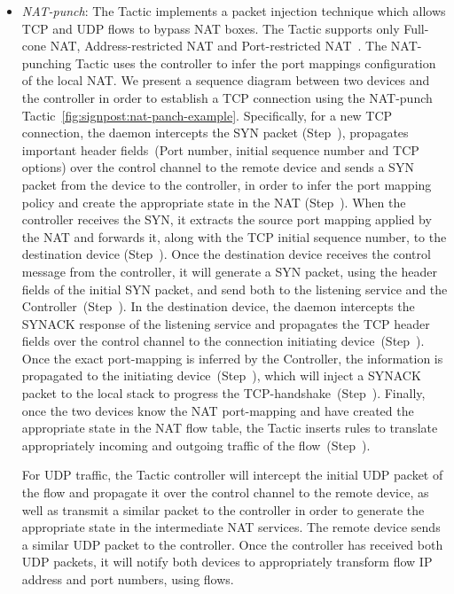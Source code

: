 \begin{itemize}
  \item \emph{NAT-punch}: The Tactic implements a packet injection technique which
    allows TCP and UDP flows to bypass NAT boxes. The Tactic supports only
    Full-cone NAT, Address-restricted NAT and Port-restricted
    NAT~\cite{RFC3489}.  The NAT-punching Tactic uses the \signpost controller to infer
    the port mappings configuration of the local NAT\@. We present a sequence
    diagram between two devices and the \signpost controller in order to establish a TCP
    connection using the NAT-punch Tactic~\ref{fig:signpost:nat-panch-example}.
    Specifically, for a new TCP connection, the daemon intercepts the SYN packet
    (Step~), propagates important header fields~(Port number, initial
    sequence number and TCP options) over the control channel to the remote
    device and sends a SYN packet from the device to the \signpost controller, in
    order to infer the port mapping policy and create the appropriate state in the
    NAT (Step~). When the \signpost controller receives the SYN, it
    extracts the source port mapping applied by the NAT and forwards it, along
    with the TCP initial sequence number, to the destination device
    (Step~).  Once the destination device receives the control message
    from the \signpost controller, it will generate a SYN packet, using the header fields
    of the initial SYN packet, and send both to the listening service and the
    \signpost Controller~(Step~). In the destination device, the
    \signpost daemon intercepts the SYNACK response of the listening service and
    propagates the TCP header fields over the control channel to the connection
    initiating device~(Step~).  Once the exact port-mapping is
    inferred by the Controller, the information is propagated to the initiating
    device~(Step~), which will inject a SYNACK packet to the local
    stack to progress the TCP-handshake~(Step~). Finally, once the two
    devices know the NAT port-mapping and have created the appropriate state in the
    NAT flow table, the Tactic inserts \of rules to translate appropriately
    incoming and outgoing traffic of the flow~(Step~).

    For UDP traffic, the Tactic controller will intercept the initial UDP packet
    of the flow and propagate it over the control channel to the remote device,
    as well as transmit a similar packet to the \signpost controller in order
    to generate the appropriate state in the intermediate NAT services. The remote
    device sends a similar UDP packet to the \signpost controller. Once the
    controller has received both UDP packets, it will notify both devices to
    appropriately transform flow IP address and port numbers, using \of flows. 
\end{itemize}

